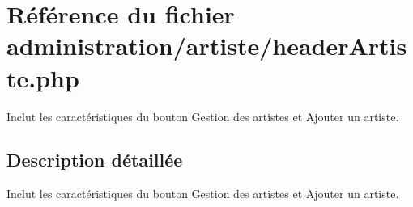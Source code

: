 \hypertarget{headerArtiste_8php}{}\section{Référence du fichier administration/artiste/header\+Artiste.php}
\label{headerArtiste_8php}


Inclut les caractéristiques du bouton Gestion des artistes et Ajouter un artiste.  




\subsection{Description détaillée}
Inclut les caractéristiques du bouton Gestion des artistes et Ajouter un artiste. 

